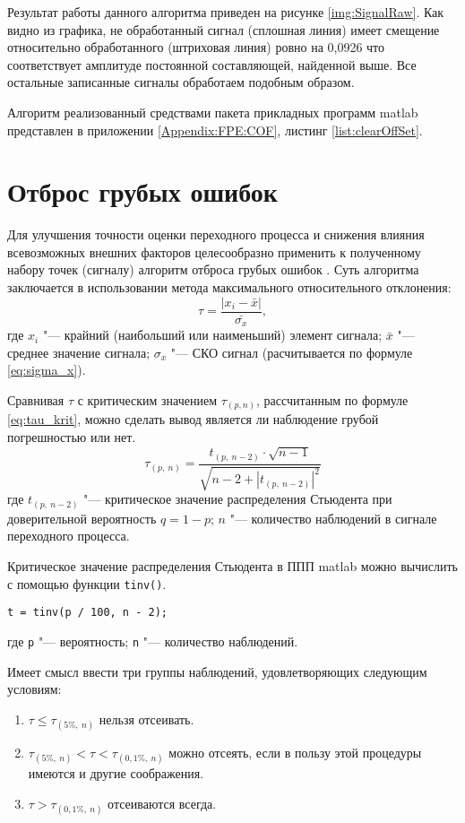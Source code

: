 Результат работы данного алгоритма приведен на рисунке \ref{img:SignalRaw}. Как видно из графика, не обработанный сигнал (сплошная линия) имеет смещение относительно обработанного (штриховая линия) ровно на 0,0926 что соответствует амплитуде постоянной составляющей, найденной выше. Все остальные записанные сигналы обработаем подобным образом.

Алгоритм реализованный средствами пакета прикладных программ matlab представлен в приложении \ref{Appendix:FPE:COF}, листинг \ref{list:clearOffSet}.

\section{Отброс грубых ошибок}\label{sect3_2}

Для улучшения точности оценки переходного процесса и снижения влияния всевозможных внешних факторов целесообразно применить к полученному набору точек (сигналу) алгоритм отброса грубых ошибок \cite{LvovStat}. Суть алгоритма заключается в использовании метода максимального относительного отклонения:
\begin{equation}\label{eq:MOO}
	\tau=\frac{|x_i-\bar{x}|}{\bar{\sigma_x}},
\end{equation} 
где $ x_i $ "--- крайний (наибольший или наименьший) элемент сигнала; $ \bar{x} $ "--- среднее значение сигнала; $ \sigma_x $ "--- СКО сигнал (расчитывается по формуле \ref{eq:sigma_x}).

Сравнивая $ \tau $ с критическим значением $ \tau_{(p,n)} $, рассчитанным по формуле \ref{eq:tau_krit}, можно сделать вывод является ли наблюдение грубой погрешностью или нет.
\begin{equation}\label{eq:tau_krit}
	\tau_{(p,\ n)}=\frac{t_{(p,\ n-2)}\cdot\sqrt{n-1}}{\sqrt{n-2+|t_{(p,\ n-2)}|^2}}
\end{equation}
где $ t_{(p,\ n-2)} $ "--- критическое значение распределения Стьюдента при доверительной вероятность $ q=1-p $; $ n $ "--- количество наблюдений в сигнале переходного процесса.

Критическое значение распределения Стьюдента в ППП matlab можно вычислить с помощью функции \lstinline{tinv()}. 
\begin{lstlisting}[stepnumber=0]
t = tinv(p / 100, n - 2);
\end{lstlisting}
где \lstinline{p} "--- вероятность; \lstinline{n} "--- количество наблюдений.

Имеет смысл ввести три группы наблюдений, удовлетворяющих следующим условиям:
\begin{enumerate}
	\item $ \tau \leqslant \tau_{(5\%,\ n)} $ нельзя отсеивать.
	\item $ \tau_{(5\%,\ n)} < \tau < \tau_{(0,1\%,\ n)} $ можно отсеять, если в пользу этой процедуры имеются и другие соображения.
	\item $ \tau > \tau_{(0,1\%,\ n)} $ отсеиваются всегда.
\end{enumerate}

